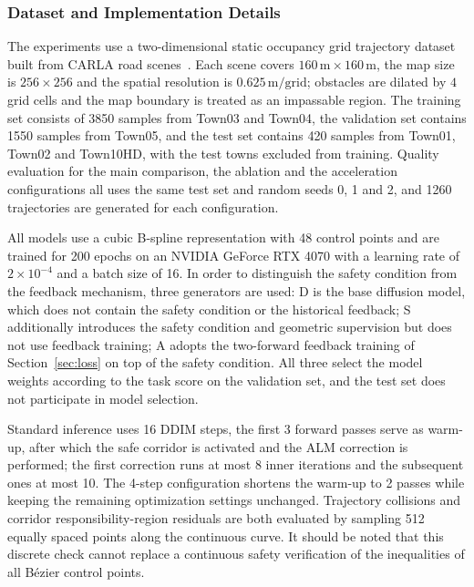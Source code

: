 \documentclass[journal]{IEEEtran}
\begin{document}
\subsubsection{Dataset and Implementation Details}

The experiments use a two-dimensional static occupancy grid trajectory dataset built from CARLA road scenes~\cite{dosovitskiy2017carla}. Each scene covers $160\,\mathrm{m}\times160\,\mathrm{m}$, the map size is $256\times256$ and the spatial resolution is $0.625\,\mathrm{m/grid}$; obstacles are dilated by $4$ grid cells and the map boundary is treated as an impassable region. The training set consists of 3850 samples from Town03 and Town04, the validation set contains 1550 samples from Town05, and the test set contains 420 samples from Town01, Town02 and Town10HD, with the test towns excluded from training. Quality evaluation for the main comparison, the ablation and the acceleration configurations all uses the same test set and random seeds 0, 1 and 2, and 1260 trajectories are generated for each configuration.

All models use a cubic B-spline representation with 48 control points and are trained for 200 epochs on an NVIDIA GeForce RTX 4070 with a learning rate of $2\times10^{-4}$ and a batch size of 16. In order to distinguish the safety condition from the feedback mechanism, three generators are used: D is the base diffusion model, which does not contain the safety condition or the historical feedback; S additionally introduces the safety condition and geometric supervision but does not use feedback training; A adopts the two-forward feedback training of Section~\ref{sec:loss} on top of the safety condition. All three select the model weights according to the task score on the validation set, and the test set does not participate in model selection.

Standard inference uses 16 DDIM steps, the first 3 forward passes serve as warm-up, after which the safe corridor is activated and the ALM correction is performed; the first correction runs at most 8 inner iterations and the subsequent ones at most 10. The 4-step configuration shortens the warm-up to 2 passes while keeping the remaining optimization settings unchanged. Trajectory collisions and corridor responsibility-region residuals are both evaluated by sampling 512 equally spaced points along the continuous curve. It should be noted that this discrete check cannot replace a continuous safety verification of the inequalities of all B\'ezier control points.
\end{document}
